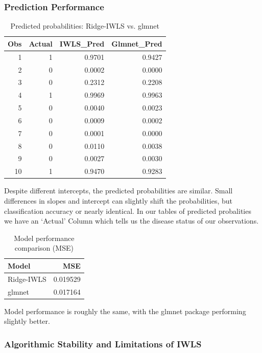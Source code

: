 \documentclass[12pt,halfline,a4paper,]{ouparticle}
\begin{document}
\subsubsection{Prediction Performance}\label{prediction-performance}

\begin{table}[!h]
\centering
\caption{\label{tab:unnamed-chunk-5}Predicted probabilities: Ridge-IWLS vs. glmnet}
\centering
\begin{tabular}[t]{r|r|r|r}
\hline
Obs & Actual & IWLS\_Pred & Glmnet\_Pred\\
\hline
1 & 1 & 0.9701 & 0.9427\\
\hline
2 & 0 & 0.0002 & 0.0000\\
\hline
3 & 0 & 0.2312 & 0.2208\\
\hline
4 & 1 & 0.9969 & 0.9963\\
\hline
5 & 0 & 0.0040 & 0.0023\\
\hline
6 & 0 & 0.0009 & 0.0002\\
\hline
7 & 0 & 0.0001 & 0.0000\\
\hline
8 & 0 & 0.0110 & 0.0038\\
\hline
9 & 0 & 0.0027 & 0.0030\\
\hline
10 & 1 & 0.9470 & 0.9283\\
\hline
\end{tabular}
\end{table}

Despite different intercepts, the predicted probabilities are similar.
Small differences in slopes and intercept can slightly shift the
probabilities, but classification accuracy or nearly identical. In our
tables of predicted probalities we have an `Actual' Column which tells
us the disease status of our observations.

\begin{table}[!h]
\centering
\caption{\label{tab:unnamed-chunk-6}Model performance comparison (MSE)}
\centering
\begin{tabular}[t]{lr}
\toprule
Model & MSE\\
\midrule
Ridge-IWLS & 0.019529\\
glmnet & 0.017164\\
\bottomrule
\end{tabular}
\end{table}

Model performance is roughly the same, with the glmnet package
performing slightly better.

\subsubsection{Algorithmic Stability and Limitations of
IWLS}\label{algorithmic-stability-and-limitations-of-iwls}
\end{document}
